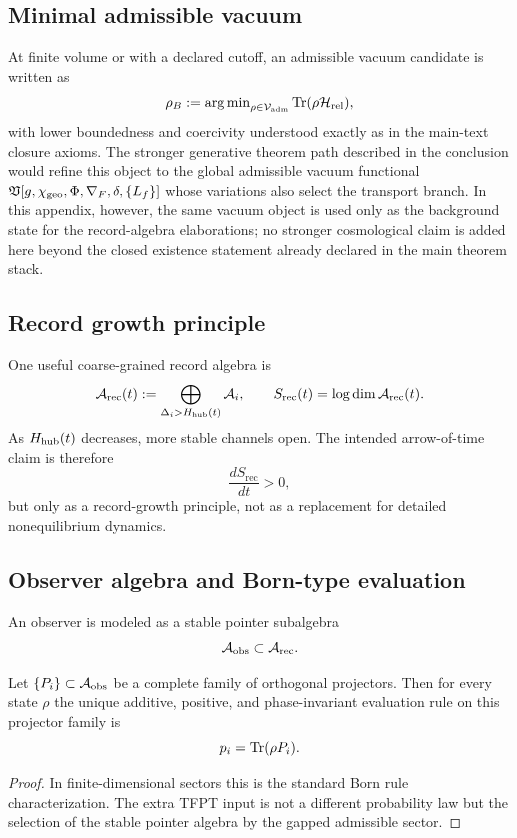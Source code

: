 \subsection{Minimal admissible vacuum}

At finite volume or with a declared cutoff, an admissible vacuum candidate is written as
\[
\rho_B
:=
\operatorname{arg\,min}_{\rho\in\mathcal V_{\mathrm{adm}}}\operatorname{Tr}(\rho\mathcal H_{\mathrm{rel}}),
\]
with lower boundedness and coercivity understood exactly as in the main-text closure axioms. The stronger generative theorem path described in the conclusion would refine this object to the global admissible vacuum functional $\mathfrak V[g,\chi_{\mathrm{geo}},\Phi,\nabla_F,\delta,\{L_f\}]$ whose variations also select the transport branch. In this appendix, however, the same vacuum object is used only as the background state for the record-algebra elaborations; no stronger cosmological claim is added here beyond the closed existence statement already declared in the main theorem stack.

\subsection{Record growth principle}

One useful coarse-grained record algebra is
\[
\mathcal A_{\mathrm{rec}}(t):=\bigoplus_{\Delta_i>H_{\mathrm{hub}}(t)}\mathcal A_i,
\qquad
S_{\mathrm{rec}}(t)=\log\dim\mathcal A_{\mathrm{rec}}(t).
\]
As $H_{\mathrm{hub}}(t)$ decreases, more stable channels open. The intended arrow-of-time claim is therefore
\[
\frac{dS_{\mathrm{rec}}}{dt}>0,
\]
but only as a record-growth principle, not as a replacement for detailed nonequilibrium dynamics.

\subsection{Observer algebra and Born-type evaluation}

An observer is modeled as a stable pointer subalgebra
\[
\mathcal A_{\mathrm{obs}}\subset\mathcal A_{\mathrm{rec}}.
\]

\begin{theorem}
\label{thm:born-pointer-algebra}
Let $\{P_i\}\subset \mathcal A_{\mathrm{obs}}$ be a complete family of orthogonal projectors. Then for every state
$\rho$ the unique additive, positive, and phase-invariant evaluation rule on this projector family is
\[
p_i=\operatorname{Tr}(\rho P_i).
\]
\end{theorem}

\begin{proof}
In finite-dimensional sectors this is the standard Born rule characterization. The extra TFPT input
is not a different probability law but the selection of the stable pointer algebra by the gapped
admissible sector.
\end{proof}

